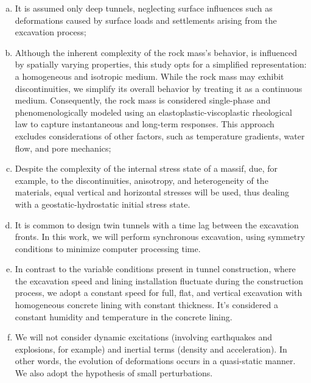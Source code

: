 \documentclass[a4paper,fleqn]{cas-sc}
\begin{document}
\begin{enumerate}[(a)]

\item It is assumed only deep tunnels, neglecting surface influences such as deformations caused by surface loads and settlements arising from the excavation process;

\item Although the inherent complexity of the rock mass's behavior, is influenced by spatially varying properties, this study opts for a simplified representation: a homogeneous and isotropic medium. While the rock mass may exhibit discontinuities, we simplify its overall behavior by treating it as a continuous medium. Consequently, the rock mass is considered single-phase and phenomenologically modeled using an elastoplastic-viscoplastic rheological law to capture instantaneous and long-term responses. This approach excludes considerations of other factors, such as temperature gradients, water flow, and pore mechanics;

\item Despite the complexity of the internal stress state of a massif, due, for example, to the discontinuities, anisotropy, and heterogeneity of the materials, equal vertical and horizontal stresses will be used, thus dealing with a geostatic-hydrostatic initial stress state.

\item It is common to design twin tunnels with a time lag between the excavation fronts. In this work, we will perform synchronous excavation, using symmetry conditions to minimize computer processing time.

\item In contrast to the variable conditions present in tunnel construction, where the excavation speed and lining installation fluctuate during the construction process, we adopt a constant speed for full, flat, and vertical excavation with homogeneous concrete lining with constant thickness. It's considered a constant humidity and temperature in the concrete lining.

\item We will not consider dynamic excitations (involving earthquakes and explosions, for example) and inertial terms (density and acceleration). In other words, the evolution of deformations occurs in a quasi-static manner. We also adopt the hypothesis of small perturbations.

\end{enumerate}
\end{document}
